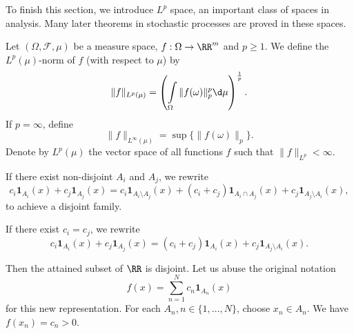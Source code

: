 To finish this section, we introduce $L^p$ space, an important class of spaces in analysis. Many later theorems in stochastic processes are proved in these spaces.

\begin{definition}
  Let $(\Omega,\mathcal{F},\mu)$ be a measure space, $f:\Omega\to\RR^m$ and $p\ge 1$. We define the $L^p(\mu)$-norm of $f$ (with respect to $\mu$) by
  $$\|f\|_{L^p(\mu)}=\left(\int\limits_\Omega \|f(\omega)\|^p_p\d \mu\right)^\frac{1}{p}.$$
  If $p=\infty$, define
  $$\|f\|_{L^\infty(\mu)}=\sup\{\|f(\omega)\|_p\}.$$
  Denote by $L^p(\mu)$ the vector space of all functions $f$ such that $\|f\|_{L^p}<\infty$.
\end{definition}

If there exist non-disjoint $A_i$ and $A_j$, we rewrite
$$c_i\mathbf{1}_{A_i}(x) + c_j\mathbf{1}_{A_j}(x) = c_i\mathbf{1}_{A_i\setminus A_j}(x) + (c_i+c_j)\mathbf{1}_{A_i \cap A_j}(x) + c_j\mathbf{1}_{A_j\setminus A_i}(x),$$
to achieve a disjoint family.

If there exist $c_i = c_j$, we rewrite
$$c_i\mathbf{1}_{A_i}(x) + c_j\mathbf{1}_{A_j}(x) = (c_i+c_j)\mathbf{1}_{A_i}(x) + c_j\mathbf{1}_{A_j\setminus A_i}(x).$$

Then the attained subset of $\RR$ is disjoint. Let us abuse the original notation
$$f(x)=\sum\limits_{n=1}^N c_n\mathbf{1}_{A_n}(x)$$
for this new representation. For each $A_n, n\in\{1,\ldots,N\}$, choose $x_n\in A_n$. We have $f(x_n) = c_n > 0$.





